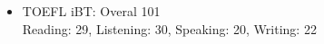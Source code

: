 \begin{itemize}
  \setlength\itemsep{0.2em}
  \item TOEFL iBT: Overal 101 \\
    Reading: 29, Listening: 30, Speaking: 20, Writing: 22
\end{itemize}
\vspace{-0.1cm}
